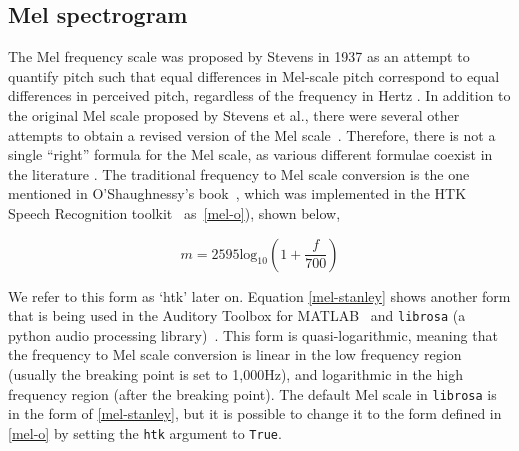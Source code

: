 \documentclass{ieeeaccess}
\newcommand{\nbh}[1]{\texttt{#1}}
\begin{document}
\subsection{Mel spectrogram}
The Mel frequency scale was proposed by Stevens in 1937 as an attempt to quantify pitch such that equal differences in Mel-scale pitch correspond to equal differences in perceived pitch, regardless of the frequency in Hertz \cite{Stevens1937ASF}. 
In addition to the original Mel scale proposed by Stevens et al., there were several other attempts to obtain a revised version of the Mel scale~\cite{Stevens1940TheRO, fant1949analys, koening1949new}. Therefore, there is not a single ``right'' formula for the Mel scale, as various different formulae coexist in the literature \cite{umesh1999fitting}.  The traditional frequency to Mel scale conversion is the one mentioned in O'Shaughnessy's book~\cite{o1987speech}, which was implemented in the HTK Speech Recognition toolkit~\cite{young2002htk} as~\eqref{mel-o}), shown below,

\begin{equation}
m=2595 \text{log}_{10}\left(1+\frac{f}{700} \right)
\label{mel-o}
\end{equation}

We refer to this form as `htk' later on. Equation \eqref{mel-stanley} shows another form that is being used in the Auditory Toolbox for MATLAB~\cite{slaney1998matlab} and \nbh{librosa} (a python audio processing library)~\cite{mcfee2015Librosa}. This form is quasi-logarithmic, meaning that the frequency to Mel scale conversion is linear in the low frequency region (usually the breaking point is set to 1,000Hz), and logarithmic in the high frequency region (after the breaking point). The default Mel scale in \nbh{librosa} is in the form of \eqref{mel-stanley}, but it is possible to change it to the form defined in \eqref{mel-o} by setting the \nbh{htk} argument to \nbh{True}.
\end{document}

